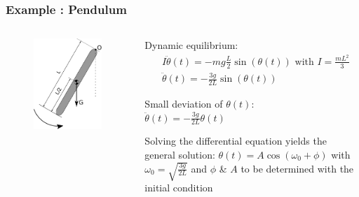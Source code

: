 \begin{frame}
	\frametitle{Example : Pendulum}
	\begin{columns}
		 \begin{column}{0.4\linewidth}
		 	\begin{figure}
			\centering
			\includegraphics[width=1\linewidth]{img/new-pendulum}
			\label{fig:pendulum}
			\end{figure}
		 \end{column}
		 \begin{column}{0.6\linewidth}
		 	Dynamic equilibrium:
		 	\begin{align*}
		 			&I\ddot{\theta}(t) = -m g \frac{L}{2} \sin(\theta(t)) \text{ with } I= \frac{m L^2}{3} \\
		 			&\ddot{\theta}(t)  = -\frac{3g}{2L} \sin(\theta(t)) 
		 	\end{align*}
		 
			Small deviation of $\theta(t)$: \\
					 \hspace{1cm} $\ddot{\theta}(t) = -\frac{3g}{2L} \theta(t)$
			
			Solving the differential equation yields the general solution:
				$\theta(t) = A\cos(\omega_0 + \phi)$
			with $\omega_0=\sqrt{\frac{3g}{2L}}$ and $\phi$ \& $A$ to be determined with the initial condition
		 \end{column}
	\end{columns}
\end{frame}

